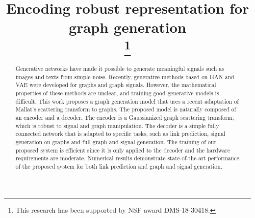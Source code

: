 \documentclass[conference]{IEEEtran}
\begin{document}
\title{Encoding robust representation for graph generation\\
\thanks{This research has been supported by NSF award DMS-18-30418.}
}

\author{
\and
{}
}

\maketitle

\begin{abstract}
Generative networks have made it possible to generate meaningful signals such as images and texts from simple noise. Recently, generative methods based on GAN and VAE were developed for graphs and graph signals. However, the mathematical properties of these methods are unclear, and training good generative models is difficult. This work proposes a graph generation model that uses a recent adaptation of Mallat's scattering transform to graphs. The proposed model is naturally composed of an encoder and a decoder. The encoder is a Gaussianized graph scattering transform, which is robust to signal and graph manipulation. The decoder is a simple fully connected network that is adapted to specific tasks, such as link prediction, signal generation on graphs and full graph and signal generation. The training of our proposed system is efficient since it is only applied to the decoder and the hardware requirements are moderate. Numerical results demonstrate state-of-the-art performance of the proposed system for both link prediction and graph and signal generation.
\end{abstract}
\end{document}
